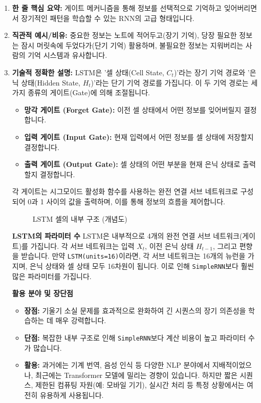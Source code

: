 \documentclass[11pt,a4paper]{book}
\theoremstyle{definition}
\begin{document}
\begin{enumerate}
    \item \textbf{한 줄 핵심 요약:} 게이트 메커니즘을 통해 정보를 선택적으로 기억하고 잊어버리면서 장기적인 패턴을 학습할 수 있는 RNN의 고급 형태입니다.
    \item \textbf{직관적 예시/비유:} 중요한 정보는 노트에 적어두고(장기 기억), 당장 필요한 정보는 잠시 머릿속에 두었다가(단기 기억) 활용하며, 불필요한 정보는 지워버리는 사람의 기억 시스템과 유사합니다.
    \item \textbf{기술적 정확한 설명:}
    LSTM은 '셀 상태(Cell State, $C_t$)'라는 장기 기억 경로와 '은닉 상태(Hidden State, $H_t$)'라는 단기 기억 경로를 가집니다. 이 두 기억 경로는 세 가지 종류의 게이트(Gate)에 의해 조절됩니다.
    \begin{itemize}
        \item \textbf{망각 게이트 (Forget Gate):} 이전 셀 상태에서 어떤 정보를 잊어버릴지 결정합니다.
        \item \textbf{입력 게이트 (Input Gate):} 현재 입력에서 어떤 정보를 셀 상태에 저장할지 결정합니다.
        \item \textbf{출력 게이트 (Output Gate):} 셀 상태의 어떤 부분을 현재 은닉 상태로 출력할지 결정합니다.
    \end{itemize}
    각 게이트는 시그모이드 활성화 함수를 사용하는 완전 연결 서브 네트워크로 구성되어 0과 1 사이의 값을 출력하며, 이를 통해 정보의 흐름을 제어합니다.

    \begin{figure}[h!]
    \centering
    \caption{LSTM 셀의 내부 구조 (개념도)}
    \label{fig:lstm_cell}
    \end{figure}

    \begin{tipbox}
    \textbf{LSTM의 파라미터 수}
    LSTM은 내부적으로 4개의 완전 연결 서브 네트워크(게이트)를 가집니다. 각 서브 네트워크는 입력 $X_t$, 이전 은닉 상태 $H_{t-1}$, 그리고 편향을 받습니다.
    만약 \texttt{LSTM(units=16)}이라면, 각 서브 네트워크는 16개의 뉴런을 가지며, 은닉 상태와 셀 상태 모두 16차원이 됩니다. 이로 인해 \texttt{SimpleRNN}보다 훨씬 많은 파라미터를 가집니다.
    \end{tipbox}

    \textbf{활용 분야 및 장단점}
    \begin{itemize}
        \item \textbf{장점:} 기울기 소실 문제를 효과적으로 완화하여 긴 시퀀스의 장기 의존성을 학습하는 데 매우 강력합니다.
        \item \textbf{단점:} 복잡한 내부 구조로 인해 \texttt{SimpleRNN}보다 계산 비용이 높고 파라미터 수가 많습니다.
        \item \textbf{활용:} 과거에는 기계 번역, 음성 인식 등 다양한 NLP 분야에서 지배적이었으나, 최근에는 Transformer 모델에 밀리는 경향이 있습니다. 하지만 짧은 시퀀스, 제한된 컴퓨팅 자원(예: 모바일 기기), 실시간 처리 등 특정 상황에서는 여전히 유용하게 사용됩니다.
    \end{itemize}
\end{enumerate}
\end{document}
